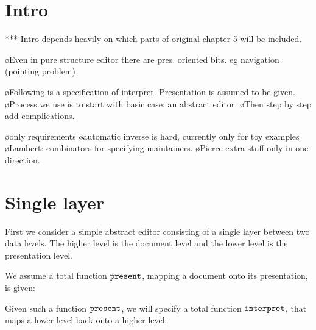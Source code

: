 %																
%																
%																
\section{Intro}

\toHere


*** Intro depends heavily on which parts of original chapter 5 will be included.


\bl
\o Even in pure structure editor there are pres. oriented bits. eg navigation (pointing problem)
\el

\bl
\o Following is a specification of interpret. Presentation is assumed to be given.
\o Process we use is to start with basic case: an abstract editor. 
\o Then step by step add complications.
\el

\bl
\o only requirements
\o automatic inverse is hard, currently only for toy examples
\o Lambert: combinators for specifying maintainers. 
\o Pierce  extra stuff only in one direction.
\el


\fromHere


%																
%																
%																
\section{Single layer} \label{sect:singleSimple}

First we consider a simple abstract editor consisting of a single layer between two data levels. The higher level is the document level and the lower level is the presentation level. 

We assume a total function ${\tt present}$, mapping a document onto its presentation, is given:



Given such a function ${\tt present}$, we will specify a total function ${\tt interpret}$, that maps a lower level back onto a higher level:


